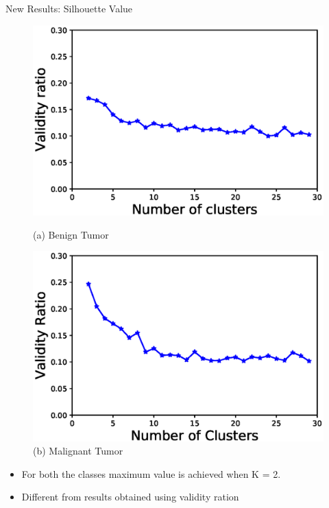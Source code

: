 \documentclass[xcolor=dvipsnames]{beamer}
\begin{document}
\begin{frame}{New Results: Silhouette Value}
\begin{figure}[H]
\begin{minipage}[t]{0.5\linewidth}
    \includegraphics[scale=0.43]{Figures/Benign_VR_K_Sil.eps}
    \caption*{(a) Benign Tumor}
\end{minipage}%
\begin{minipage}[t]{0.5\linewidth}
    \includegraphics[scale=0.43]{Figures/Malignant_VR_K_Sil.eps}
    \caption*{(b) Malignant Tumor}
\end{minipage} 
\end{figure}

\begin{block}{}
\begin{itemize}
\item For both the classes maximum value is achieved when K = 2.
\item Different from results obtained using validity ration
\end{itemize} 
\end{block}
\end{frame}
\end{document}
